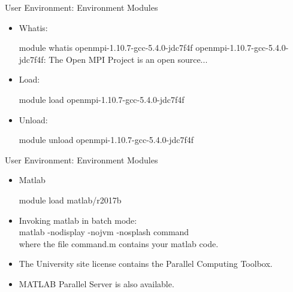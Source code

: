 \begin{frame}[fragile]{User Environment: Environment Modules}
\begin{itemize}
\item{Whatis:}
\begin{semiverbatim}
\tiny
module whatis openmpi-1.10.7-gcc-5.4.0-jdc7f4f
openmpi-1.10.7-gcc-5.4.0-jdc7f4f: The Open MPI Project is an open source...
\end{semiverbatim}
\medskip
\item{Load:}
\begin{semiverbatim}
\scriptsize
module load openmpi-1.10.7-gcc-5.4.0-jdc7f4f
\end{semiverbatim}
\medskip
\item{Unload:}
\begin{semiverbatim}
\scriptsize
module unload openmpi-1.10.7-gcc-5.4.0-jdc7f4f
\end{semiverbatim}
\end{itemize}
\end{frame}

\begin{frame}[fragile]{User Environment: Environment Modules}
\begin{itemize}
\item{Matlab}
\begin{semiverbatim}
\scriptsize
module load matlab/r2017b
\end{semiverbatim}
\medskip\pause
\item{Invoking matlab in batch mode:\hfill\\
  \qquad \alert{matlab -nodisplay -nojvm -nosplash command}\hfill\\
  where the file \alert{command.m} contains your matlab code.}
  \pause
\item{The University site license contains the \alert{Parallel Computing Toolbox}.}
  \pause
  \item{\alert{MATLAB Parallel Server} is also available.}
\end{itemize}
\end{frame}

